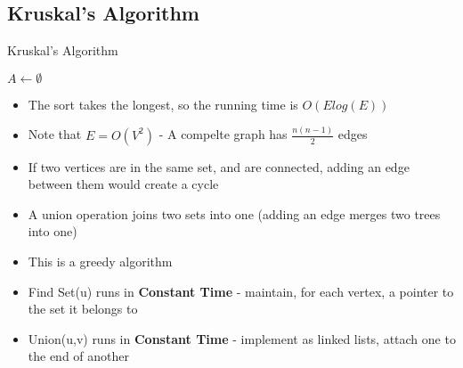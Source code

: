 \documentclass[12pt]{article}
\begin{document}
\pagebreak


\pagebreak

\subsection*{Kruskal's Algorithm}

\begin{algorithm}

  \caption{Kruskal's Algorithm}

  \begin{algorithmic}


    \State $A \gets \emptyset$
    
    \EndFor


      \EndIf
    \EndFor

    \EndProcedure

  \end{algorithmic}

\end{algorithm}

\begin{itemize}
  \item The sort takes the longest, so the running time is $O(E log(E))$
  \item Note that $E = O(V^2)$ - A compelte graph has $\frac{n(n-1)}{2}$ edges
  \item If two vertices are in the same set, and are connected, adding an edge between them would create a cycle
  \item A union operation joins two sets into one (adding an edge merges two trees into one)
  \item This is a greedy algorithm
  \item Find Set(u) runs in \textbf{Constant Time} - maintain, for each vertex, a pointer to the set it belongs to
  \item Union(u,v) runs in \textbf{Constant Time} - implement as linked lists, attach one to the end of another
\end{itemize}

\pagebreak
\end{document}
